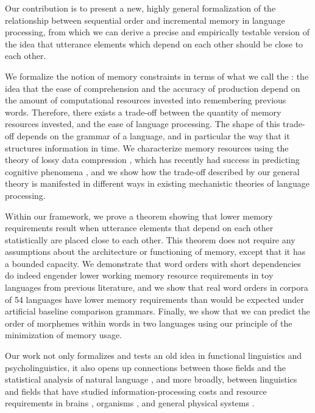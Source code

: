 Our contribution is to present a new, highly general formalization of the relationship between sequential order and incremental memory in language processing, from which we can derive a precise and empirically testable version of the idea that utterance elements which depend on each other should be close to each other. 

We formalize the notion of memory constraints in terms of what we call the : the idea that the ease of comprehension and the accuracy of production depend on the amount of computational resources invested into remembering previous words.
Therefore, there exists a trade-off between the quantity of memory resources invested, and the ease of language processing.
The shape of this trade-off depends on the grammar of a language, and in particular the way that it structures information in time.
We characterize memory resources using the theory of lossy data compression \citep{cover2006elements,berger}, which has recently had success in predicting cognitive phenomena \citep{sims2018efficient,gershman}, and we show how the trade-off described by our general theory is manifested in different ways in existing mechanistic theories of language processing. 

Within our framework, we prove a theorem showing that lower memory requirements result when utterance elements that depend on each other statistically are placed close to each other. This theorem does not require any assumptions about the architecture or functioning of memory, except that it has a bounded capacity. We demonstrate that word orders with short dependencies do indeed engender lower working memory resource requirements in toy languages from previous literature, and we show that real word orders in corpora of 54 languages have lower memory requirements than would be expected under artificial baseline comparison grammars. Finally, we show that we can predict the order of morphemes within words in two languages using our principle of the minimization of memory usage.

Our work not only formalizes and tests an old idea in functional linguistics and psycholinguistics, it also opens up connections between those fields and the statistical analysis of natural language \citep{debowski-excess-2011,bentz2017word,lin-critical-2017}, and more broadly, between linguistics and fields that have studied information-processing costs and resource requirements in brains \citep{friston}, organisms \citep{england}, and general physical systems \citep{still2012thermodynamic}. 





